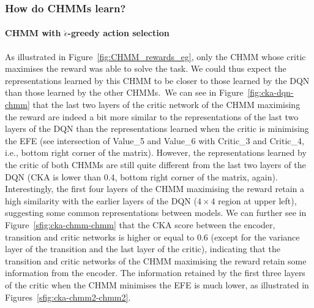 \documentclass[twoside,11pt]{article}
\begin{document}
\subsubsection{How do CHMMs learn?}

\paragraph{CHMM with $\mathring{\epsilon}$-greedy action selection}
As illustrated in Figure~\ref{fig:CHMM_rewards_eg}, only the CHMM whose critic maximises the reward was able to solve the task. We could thus expect the representations learned by this CHMM to be closer to those learned by the DQN than those learned by the other CHMMs.~We can see in Figure~\ref{fig:cka-dqn-chmm} that the last two layers of the critic network of the CHMM maximising the reward are indeed a bit more similar to the representations of the last two layers of the DQN than the representations learned when the critic is minimising the EFE (see intersection of Value\_5 and Value\_6 with Critic\_3 and Critic\_4, i.e., bottom right corner of the matrix). However, the representations learned by the critic of both CHMMs are still quite different from the last two layers of the DQN (CKA is lower than 0.4, bottom right corner of the matrix, again). Interestingly, the first four layers of the CHMM maximising the reward retain a high similarity with the earlier layers of the DQN ($4\times4$ region at upper left), suggesting some common representations between models. We can further see in Figure~\ref{sfig:cka-chmm-chmm} that the CKA score between the encoder, transition and critic networks is higher or equal to 0.6 (except for the variance layer of the transition and the last layer of the critic), indicating that the transition and critic networks of the CHMM maximising the reward retain some information from the encoder. The information retained by the first three layers of the critic when the CHMM minimises the EFE is much lower, as illustrated in Figures~\ref{sfig:cka-chmm2-chmm2}.
\end{document}
